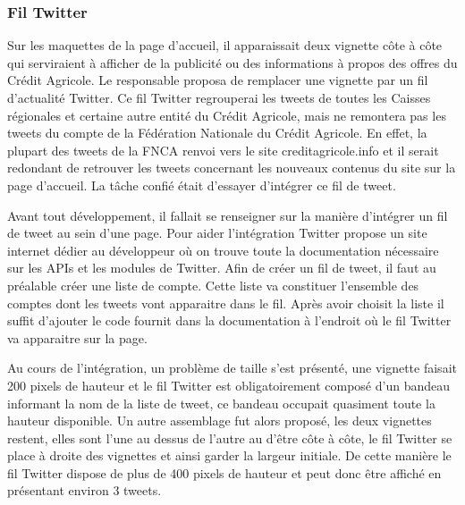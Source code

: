 \documentclass[12pt,a4paper]{article}
\begin{document}
\subsubsection{Fil Twitter}
Sur les maquettes de la page d'accueil, il apparaissait deux vignette côte à côte qui serviraient à afficher de la publicité ou des informations à propos des offres du Crédit Agricole. Le responsable proposa de remplacer une vignette par un fil d'actualité Twitter. Ce fil Twitter regrouperai les tweets de toutes les Caisses régionales et certaine autre entité du Crédit Agricole, mais ne remontera pas les tweets du compte de la Fédération Nationale du Crédit Agricole. En effet, la plupart des tweets de la FNCA renvoi vers le site creditagricole.info et il serait redondant de retrouver les tweets concernant les nouveaux contenus du site sur la page d'accueil. La tâche confié était d'essayer d'intégrer ce fil de tweet.\par
Avant tout développement, il fallait se renseigner sur la manière d'intégrer un fil de tweet au sein d'une page. Pour aider l'intégration Twitter propose un site internet dédier au développeur où on trouve toute la documentation nécessaire sur les APIs et les modules de Twitter. Afin de créer un fil de tweet, il faut au préalable créer une liste de compte. Cette liste va constituer l'ensemble des comptes dont les tweets vont apparaitre dans le fil. Après avoir choisit la liste il suffit d'ajouter le code fournit dans la documentation à l'endroit où le fil Twitter va apparaitre sur la page.\par
Au cours de l'intégration, un problème de taille s'est présenté, une vignette faisait 200 pixels de hauteur et le fil Twitter est obligatoirement composé d'un bandeau informant la nom de la liste de tweet, ce bandeau occupait quasiment toute la hauteur disponible. Un autre assemblage fut alors proposé, les deux vignettes restent, elles sont l'une au dessus de l'autre au d'être côte à côte, le fil Twitter se place à droite des vignettes et ainsi garder la largeur initiale. De cette manière le fil Twitter dispose de plus de 400 pixels de hauteur et peut donc être affiché en présentant environ 3 tweets.\par 
\end{document}
